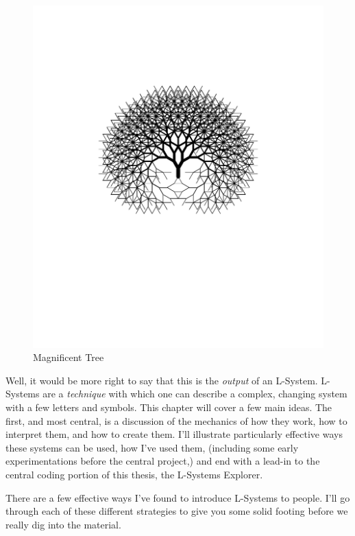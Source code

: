 \documentclass[12pt,twoside]{reedthesis}
\begin{document}
	\begin{figure}[h]
	\centering
	\includegraphics[clip=true, viewport=1in 4.6in 9in 9in, scale=0.45]{Images/WhatisanL-System1}
	\caption[Magnificent Tree]{Magnificent Tree\footnotemark}
	\label {Motivations3}
	\end{figure}

	Well, it would be more right to say that this is the \textit{output} of an L-System. L-Systems are a \textit{technique} with which one can describe a complex, changing system with a few letters and symbols. This chapter will cover a few main ideas. The first, and most central, is a discussion of the mechanics of how they work, how to interpret them, and how to create them. I’ll illustrate particularly effective ways these systems can be used, how I’ve used them, (including some early experimentations before the central project,) and end with a lead-in to the central coding portion of this thesis, the L-Systems Explorer.

	There are a few effective ways I've found to introduce L-Systems to people. I'll go through each of these different strategies to give you some solid footing before we really dig into the material.
\end{document}
